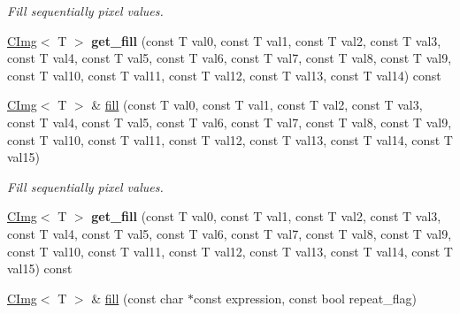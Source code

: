 \begin{DoxyCompactItemize}
\begin{DoxyCompactList}\small\item\em Fill sequentially pixel values. \item\end{DoxyCompactList}\item 
\hypertarget{structcimg__library_1_1CImg_ad4e7a18814eab81add7ec4d9ff4ffb5c}{
\hyperlink{structcimg__library_1_1CImg}{CImg}$<$ T $>$ {\bfseries get\_\-fill} (const T val0, const T val1, const T val2, const T val3, const T val4, const T val5, const T val6, const T val7, const T val8, const T val9, const T val10, const T val11, const T val12, const T val13, const T val14) const }
\label{structcimg__library_1_1CImg_ad4e7a18814eab81add7ec4d9ff4ffb5c}

\item 
\hypertarget{structcimg__library_1_1CImg_a29b6f70a91ef14cae3f62fbf1c5a1df2}{
\hyperlink{structcimg__library_1_1CImg}{CImg}$<$ T $>$ \& \hyperlink{structcimg__library_1_1CImg_a29b6f70a91ef14cae3f62fbf1c5a1df2}{fill} (const T val0, const T val1, const T val2, const T val3, const T val4, const T val5, const T val6, const T val7, const T val8, const T val9, const T val10, const T val11, const T val12, const T val13, const T val14, const T val15)}
\label{structcimg__library_1_1CImg_a29b6f70a91ef14cae3f62fbf1c5a1df2}

\begin{DoxyCompactList}\small\item\em Fill sequentially pixel values. \item\end{DoxyCompactList}\item 
\hypertarget{structcimg__library_1_1CImg_ac8f1208c96bdfdbc421155eaafdedc73}{
\hyperlink{structcimg__library_1_1CImg}{CImg}$<$ T $>$ {\bfseries get\_\-fill} (const T val0, const T val1, const T val2, const T val3, const T val4, const T val5, const T val6, const T val7, const T val8, const T val9, const T val10, const T val11, const T val12, const T val13, const T val14, const T val15) const }
\label{structcimg__library_1_1CImg_ac8f1208c96bdfdbc421155eaafdedc73}

\item 
\hypertarget{structcimg__library_1_1CImg_a3b3be1db46e76ec38eaf0e622a89cf86}{
\hyperlink{structcimg__library_1_1CImg}{CImg}$<$ T $>$ \& \hyperlink{structcimg__library_1_1CImg_a3b3be1db46e76ec38eaf0e622a89cf86}{fill} (const char $\ast$const expression, const bool repeat\_\-flag)}
\label{structcimg__library_1_1CImg_a3b3be1db46e76ec38eaf0e622a89cf86}


\end{DoxyCompactItemize}
